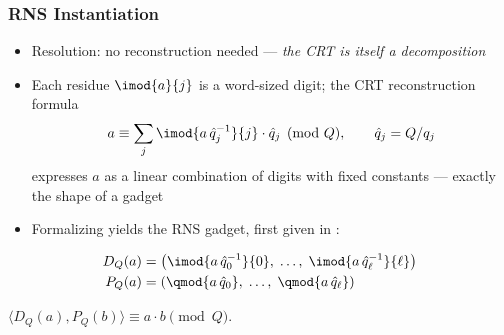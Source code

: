 {    \subsubsection{RNS Instantiation}
    \begin{itemize}
        \item Resolution: no reconstruction needed --- \emph{the CRT is itself a decomposition}
        \item Each residue $\imod{a}{j}$ is a word-sized digit; the CRT reconstruction formula
              \begin{equation*}
                  a \equiv \sum_j \imod{a\,\hat{q}_j^{-1}}{j} \cdot \hat{q}_j \pmod{Q},
                  \qquad \hat{q}_j = Q/q_j
              \end{equation*}
              expresses $a$ as a linear combination of digits with fixed constants ---
              exactly the shape of a gadget
        \item Formalizing yields the RNS gadget, first given in \cite{cryptoeprint:2016/510}:
    \end{itemize}
    \begin{align}
        \label{eq:bv:d}
        D_{Q}(a) &= \left(\imod{a\,\hat{q}_0^{-1}}{0},\; \dots,\; \imod{a\,\hat{q}_\ell^{-1}}{\ell}\right) \\
        \label{eq:bv:p}
        P_{Q}(a) &= \left(\qmod{a\,\hat{q}_0},\; \dots,\; \qmod{a\,\hat{q}_\ell}\right)
    \end{align}
    
    \begin{lemma}
        \label{lemma:bv_gadget}
        $\langle D_Q(a), P_Q(b)\rangle \equiv a\cdot b \pmod{Q}$.
    \end{lemma}
    
}
